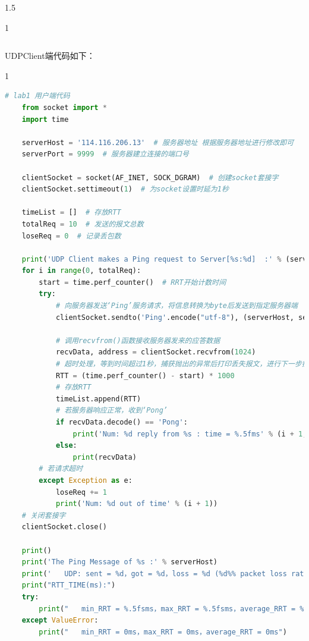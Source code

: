 \documentclass[a4paper,12pt]{report}
\begin{document}
\begin{spacing}{1.5}
\begin{spacing}{1}
\begin{lstlisting}[language={Python}]
		\end{lstlisting}
\end{spacing}

UDPClient端代码如下：
\begin{spacing}{1}  
	\begin{lstlisting}[language={Python}]
    # lab1 用户端代码
    from socket import *
    import time
    
    serverHost = '114.116.206.13'  # 服务器地址 根据服务器地址进行修改即可
    serverPort = 9999  # 服务器建立连接的端口号
    
    clientSocket = socket(AF_INET, SOCK_DGRAM)  # 创建socket套接字
    clientSocket.settimeout(1)  # 为socket设置时延为1秒
    
    timeList = []  # 存放RTT
    totalReq = 10  # 发送的报文总数
    loseReq = 0  # 记录丢包数
    
    print('UDP Client makes a Ping request to Server[%s:%d]  :' % (serverHost, serverPort))
    for i in range(0, totalReq):
        start = time.perf_counter()  # RRT开始计数时间
        try:
            # 向服务器发送‘Ping’服务请求，将信息转换为byte后发送到指定服务器端
            clientSocket.sendto('Ping'.encode("utf-8"), (serverHost, serverPort))
    
            # 调用recvfrom()函数接收服务器发来的应答数据
            recvData, address = clientSocket.recvfrom(1024)
            # 超时处理，等到时间超过1秒，捕获抛出的异常后打印丢失报文，进行下一步操作
            RTT = (time.perf_counter() - start) * 1000
            # 存放RTT
            timeList.append(RTT)
            # 若服务器响应正常，收到‘Pong’
            if recvData.decode() == 'Pong':
                print('Num: %d reply from %s : time = %.5fms' % (i + 1, serverHost, RTT))
            else:
                print(recvData)
        # 若请求超时
        except Exception as e:
            loseReq += 1
            print('Num: %d out of time' % (i + 1))
    # 关闭套接字
    clientSocket.close()
    
    print()
    print('The Ping Message of %s :' % serverHost)
    print('   UDP: sent = %d，got = %d，loss = %d (%d%% packet loss rate)' % (i + 1, i - loseReq + 1, loseReq, (loseReq / (i + 1)) * 100))
    print("RTT_TIME(ms):")
    try:
        print("   min_RRT = %.5fsms，max_RRT = %.5fsms，average_RRT = %.5fsms" % (min(timeList), max(timeList), sum(timeList)/len(timeList)))
    except ValueError:
        print("   min_RRT = 0ms，max_RRT = 0ms，average_RRT = 0ms")
		\end{lstlisting}
\end{spacing}


\end{spacing}
\end{document}
